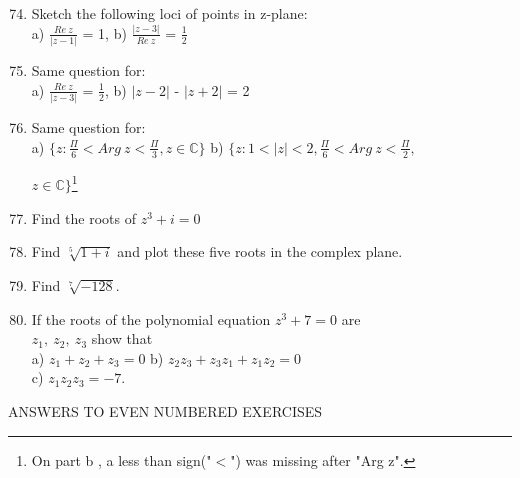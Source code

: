 \documentclass[11pt]{amsbook}
\begin{document}
\begin{enumerate}
	\setcounter{enumi}{73}

	\item Sketch the following loci of points in z-plane:\\
	a) $\frac{Re\ z}{|z - 1|}$ = 1,  b) $\frac{|z-3|}{Re\ z}$ = $\frac{1}{2}$ 

	\item Same question for:\\
	a) $\frac{Re\ z}{|z-3|}$ = $\frac{1}{2}$, b) $|z-2|$ - $|z+2|$ = 2  

	\item Same question for:\\
	a) $\{z:\frac{\Pi}{6}<Arg\ z<\frac{\Pi}{3},z\in\mathbb{C}\}$   b) $\{z:1<|z|<2,\frac{\Pi}{6}<Arg\ z<\frac{\Pi}{2},$ 
	\begin{flushright}$z\in\mathbb{C}\}$\footnote{On part b , a less than sign("$<$") was missing after "Arg z".}\end{flushright}

	\item Find the roots of $z^{3}+i=0$

	\item Find $\sqrt[5]{1+i}$ and plot these five roots in the complex plane.

	\item Find $\sqrt[7]{-128}$.

	\item If the roots of the polynomial equation $z^{3}+7=0$ are\\
	$z_{1},\ z_{2},\ z_{3}$ show that\\
	a) $z_{1}+z_{2}+z_{3}=0$ b) $z_{2}z_{3}+z_{3}z_{1}+z_{1}z_{2}=0$\\
	c) $z_{1}z_{2}z_{3}=-7$.

\end{enumerate}

\begin{center}
	ANSWERS TO EVEN NUMBERED EXERCISES
\end{center}
\end{document}
